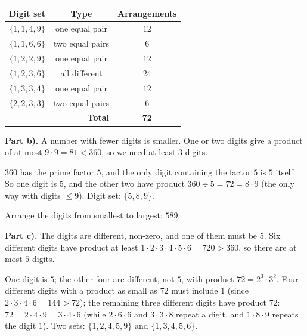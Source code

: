 {
\begin{center}
\begin{tabular}{|c|c|c|}
\hline
\rowcolor{Tint}Digit set & Type & Arrangements\\
\hline
$\{1,1,4,9\}$ & one equal pair & $12$\\
$\{1,1,6,6\}$ & two equal pairs & $6$\\
$\{1,2,2,9\}$ & one equal pair & $12$\\
$\{1,2,3,6\}$ & all different & $24$\\
$\{1,3,3,4\}$ & one equal pair & $12$\\
$\{2,2,3,3\}$ & two equal pairs & $6$\\
\hline
\multicolumn{2}{|r|}{\textbf{Total}} & $\mathbf{72}$\\
\hline
\end{tabular}
\end{center}

\par\smallskip\textbf{Part b).}
A number with fewer digits is smaller. One or two digits give a product of at most $9\cdot 9=81<360$, so we need at least $3$ digits.

$360$ has the prime factor $5$, and the only digit containing the factor $5$ is $5$ itself. So one digit is $5$, and the other two have product $360\div 5=72=8\cdot 9$ (the only way with digits $\le 9$). Digit set: $\{5,8,9\}$.

Arrange the digits from smallest to largest: $589$.

\par\smallskip\textbf{Part c).}
The digits are different, non-zero, and one of them must be $5$. Six different digits have product at least $1\cdot2\cdot3\cdot4\cdot5\cdot6=720>360$, so there are at most $5$ digits.

One digit is $5$; the other four are different, not $5$, with product $72=2^3\cdot 3^2$. Four different digits with a product as small as $72$ must include $1$ (since $2\cdot3\cdot4\cdot6=144>72$); the remaining three different digits have product $72$: $72=2\cdot4\cdot9=3\cdot4\cdot6$ (while $2\cdot 6\cdot 6$ and $3\cdot 3\cdot 8$ repeat a digit, and $1\cdot 8\cdot 9$ repeats the digit $1$). Two sets: $\{1,2,4,5,9\}$ and $\{1,3,4,5,6\}$.

}
